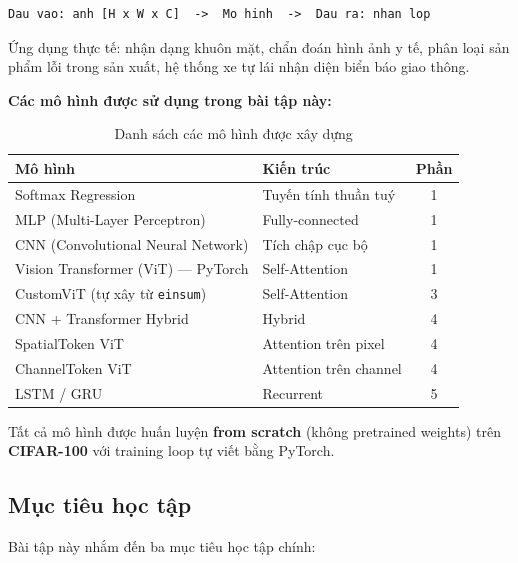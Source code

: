 \documentclass[12pt, a4paper]{article}
\begin{document}
\begin{lstlisting}[style=plainstyle]
Dau vao: anh [H x W x C]  ->  Mo hinh  ->  Dau ra: nhan lop
\end{lstlisting}

Ứng dụng thực tế: nhận dạng khuôn mặt, chẩn đoán hình ảnh y tế, phân loại sản phẩm lỗi trong sản xuất, hệ thống xe tự lái nhận diện biển báo giao thông.

\textbf{Các mô hình được sử dụng trong bài tập này:}

\begin{table}[H]
\centering
\caption{Danh sách các mô hình được xây dựng}
\begin{tabular}{llc}
\toprule
\textbf{Mô hình} & \textbf{Kiến trúc} & \textbf{Phần} \\
\midrule
Softmax Regression          & Tuyến tính thuần tuý      & 1 \\
MLP (Multi-Layer Perceptron)& Fully-connected           & 1 \\
CNN (Convolutional Neural Network) & Tích chập cục bộ  & 1 \\
Vision Transformer (ViT) --- PyTorch & Self-Attention   & 1 \\
CustomViT (tự xây từ \texttt{einsum}) & Self-Attention  & 3 \\
CNN + Transformer Hybrid    & Hybrid                    & 4 \\
SpatialToken ViT            & Attention trên pixel      & 4 \\
ChannelToken ViT            & Attention trên channel    & 4 \\
LSTM / GRU                  & Recurrent                 & 5 \\
\bottomrule
\end{tabular}
\end{table}

Tất cả mô hình được huấn luyện \textbf{from scratch} (không pretrained weights) trên \textbf{CIFAR-100} với training loop tự viết bằng PyTorch.

\subsection{Mục tiêu học tập}

Bài tập này nhắm đến ba mục tiêu học tập chính:
\end{document}
